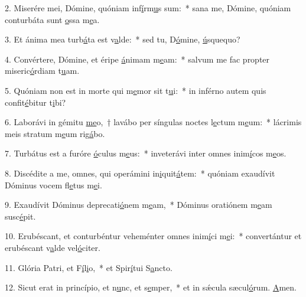 2. Miserére mei, Dómine, quóniam inf\uline{í}rm\uline{u}s sum:~* sana me, Dómine, quóniam conturbáta sunt \uline{o}ssa m\uline{e}a.\par 
3. Et ánima mea turb\uline{á}ta est v\uline{a}lde:~* sed tu, D\uline{ó}mine, \uline{ú}squequo?\par 
4. Convértere, Dómine, et éripe \uline{á}nimam m\uline{e}am:~* salvum me fac propter miseric\uline{ó}rdiam t\uline{u}am.\par 
5. Quóniam non est in morte qui m\uline{e}mor sit t\uline{u}i:~* in inférno autem quis confit\uline{é}bitur t\uline{i}bi?\par 
6. Laborávi in gémitu \uline{me}o,~† lavábo per síngulas noctes l\uline{e}ctum m\uline{e}um:~* lácrimis meis stratum m\uline{e}um rig\uline{á}bo.\par 
7. Turbátus est a furóre \uline{ó}culus m\uline{e}us:~* inveterávi inter omnes inim\uline{í}cos m\uline{e}os.\par 
8. Discédite a me, omnes, qui operámini in\uline{i}quit\uline{á}tem:~* quóniam exaudívit Dóminus vocem fl\uline{e}tus m\uline{e}i.\par 
9. Exaudívit Dóminus deprecati\uline{ó}nem m\uline{e}am,~* Dóminus oratiónem m\uline{e}am susc\uline{é}pit.\par 
10. Erubéscant, et conturbéntur veheménter omnes inim\uline{í}ci m\uline{e}i:~* convertántur et erubéscant v\uline{a}lde vel\uline{ó}citer.\par 
11. Glória Patri, et F\uline{í}l\uline{i}o,~* et Spir\uline{í}tui S\uline{a}ncto.\par 
12. Sicut erat in princípio, et n\uline{u}nc, et s\uline{e}mper,~* et in sǽcula sæcul\uline{ó}rum. \uline{A}men.\par 
